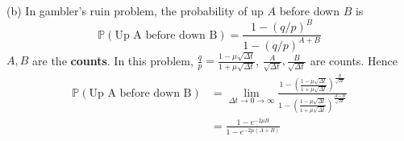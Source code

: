 \documentclass[a4paper, 10pt]{article}
\theoremstyle{definition}
\theoremstyle{hSol}
\begin{document}
(b) In gambler's ruin problem, the probability of up $A$ before down $B$ is 
\begin{equation}
  \mathbb{P}\left(\text{Up A before down B}\right) = \frac{1-(q/p)^B}{1-(q/p)^{A+B}}
\end{equation}
$A, B$ are the \textbf{counts}. In this problem, $\frac{q}{p}=\frac{1-\mu\sqrt{\Delta t}}{1+\mu\sqrt{\Delta t}}$, $\frac{A}{\sqrt{\Delta t}}, \frac{B}{\sqrt{\Delta t}}$ are counts. Hence
\begin{equation}
  \begin{split}
    \mathbb{P}\left(\text{Up A before down B}\right) &= \lim\limits_{\Delta t \to 0\rightarrow\infty}\frac{1-\left(\frac{1-\mu\sqrt{\Delta t}}{1+\mu\sqrt{\Delta t}}\right)^{\frac{B}{\sqrt{\Delta t}}}}{1-\left(\frac{1-\mu\sqrt{\Delta t}}{1+\mu\sqrt{\Delta t}}\right)^{\frac{A+B}{\sqrt{\Delta t}}}} \\
    &= \frac{1-e^{-2\mu B}}{1-e^{-2\mu(A+B)}}
  \end{split}
\end{equation}
\end{document}
